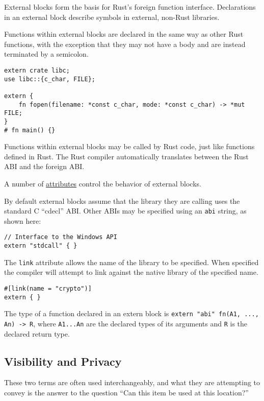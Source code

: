 \documentclass[]{article}
\begin{document}
External blocks form the basis for Rust's foreign function interface.
Declarations in an external block describe symbols in external, non-Rust
libraries.

Functions within external blocks are declared in the same way as other
Rust functions, with the exception that they may not have a body and are
instead terminated by a semicolon.

\begin{verbatim}
extern crate libc;
use libc::{c_char, FILE};

extern {
    fn fopen(filename: *const c_char, mode: *const c_char) -> *mut FILE;
}
# fn main() {}
\end{verbatim}

Functions within external blocks may be called by Rust code, just like
functions defined in Rust. The Rust compiler automatically translates
between the Rust ABI and the foreign ABI.

A number of \hyperref[attributes]{attributes} control the behavior of
external blocks.

By default external blocks assume that the library they are calling uses
the standard C ``cdecl'' ABI. Other ABIs may be specified using an
\texttt{abi} string, as shown here:

\begin{verbatim}
// Interface to the Windows API
extern "stdcall" { }
\end{verbatim}

The \texttt{link} attribute allows the name of the library to be
specified. When specified the compiler will attempt to link against the
native library of the specified name.

\begin{verbatim}
#[link(name = "crypto")]
extern { }
\end{verbatim}

The type of a function declared in an extern block is
\texttt{extern "abi" fn(A1, ..., An) -\textgreater{} R}, where
\texttt{A1...An} are the declared types of its arguments and \texttt{R}
is the declared return type.

\subsection{Visibility and Privacy}\label{visibility-and-privacy}

These two terms are often used interchangeably, and what they are
attempting to convey is the answer to the question ``Can this item be
used at this location?''
\end{document}
